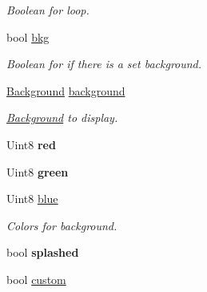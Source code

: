 \begin{DoxyCompactItemize}
\begin{DoxyCompactList}\small\item\em Boolean for loop. \end{DoxyCompactList}\item 
bool \hyperlink{classEngine_a1392f77c91da64239d2d644acddf21a0}{bkg}\hypertarget{classEngine_a1392f77c91da64239d2d644acddf21a0}{}\label{classEngine_a1392f77c91da64239d2d644acddf21a0}

\begin{DoxyCompactList}\small\item\em Boolean for if there is a set background. \end{DoxyCompactList}\item 
\hyperlink{classBackground}{Background} \hyperlink{classEngine_a86d0ff9c06aca73dd86041855f78623a}{background}\hypertarget{classEngine_a86d0ff9c06aca73dd86041855f78623a}{}\label{classEngine_a86d0ff9c06aca73dd86041855f78623a}

\begin{DoxyCompactList}\small\item\em \hyperlink{classBackground}{Background} to display. \end{DoxyCompactList}\item 
Uint8 {\bfseries red}\hypertarget{classEngine_a9993bdb60f6f36f00e8e70813a2fa802}{}\label{classEngine_a9993bdb60f6f36f00e8e70813a2fa802}

\item 
Uint8 {\bfseries green}\hypertarget{classEngine_a8522a7fc607deb9f9b615c72e824bb68}{}\label{classEngine_a8522a7fc607deb9f9b615c72e824bb68}

\item 
Uint8 \hyperlink{classEngine_aa420e5ea65d09324326c0f8ce7a335f3}{blue}\hypertarget{classEngine_aa420e5ea65d09324326c0f8ce7a335f3}{}\label{classEngine_aa420e5ea65d09324326c0f8ce7a335f3}

\begin{DoxyCompactList}\small\item\em Colors for background. \end{DoxyCompactList}\item 
bool {\bfseries splashed}\hypertarget{classEngine_aebef67a62082435a9bd7d2b3a70889b4}{}\label{classEngine_aebef67a62082435a9bd7d2b3a70889b4}

\item 
bool \hyperlink{classEngine_a571947abb4b69c3f9fbe81d8135829e8}{custom}\hypertarget{classEngine_a571947abb4b69c3f9fbe81d8135829e8}{}\label{classEngine_a571947abb4b69c3f9fbe81d8135829e8}


\end{DoxyCompactItemize}
